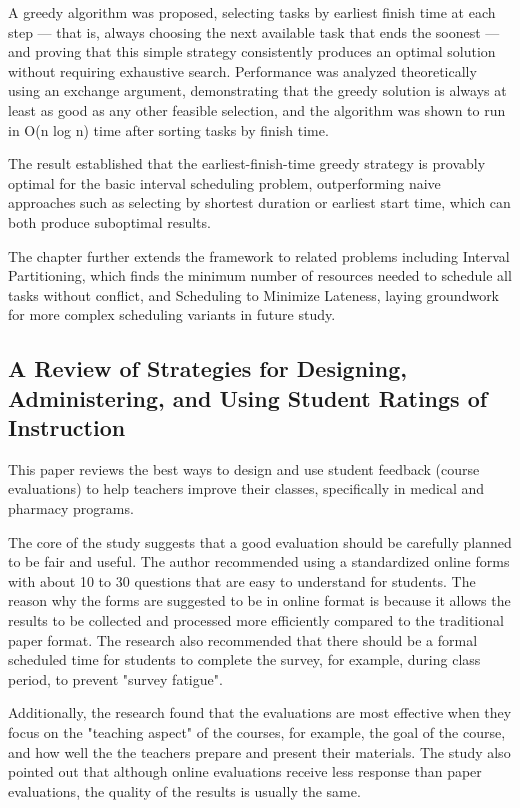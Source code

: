 A greedy algorithm was proposed, selecting tasks by earliest finish time at each step — that is, always choosing the next available task that ends the soonest — and proving that this simple strategy consistently produces an optimal solution without requiring exhaustive search.
Performance was analyzed theoretically using an exchange argument, demonstrating that the greedy solution is always at least as good as any other feasible selection, and the algorithm was shown to run in O(n log n) time after sorting tasks by finish time.

The result established that the earliest-finish-time greedy strategy is provably optimal for the basic interval scheduling problem, outperforming naive approaches such as selecting by shortest duration or earliest start time, which can both produce suboptimal results.

The chapter further extends the framework to related problems including Interval Partitioning, which finds the minimum number of resources needed to schedule all tasks without conflict, and Scheduling to Minimize Lateness, laying groundwork for more complex scheduling variants in future study.


\subsection{A Review of Strategies for Designing, Administering, and Using Student Ratings of Instruction \cite{paper_14}}

This paper reviews the best ways to design and use student feedback (course evaluations) to help teachers improve their classes, specifically in medical and pharmacy programs.

The core of the study suggests that a good evaluation should be carefully planned to be fair and useful. The author recommended using a standardized online forms with about 10 to 30 questions that are easy to understand for students. The reason why the forms are suggested to be in online format is because it allows the results to be collected and processed more efficiently compared to the traditional paper format. The research also recommended that there should be a formal scheduled time for students to complete the survey, for example, during class period, to prevent "survey fatigue".

Additionally, the research found that the evaluations are most effective when they focus on the "teaching aspect" of the courses, for example, the goal of the course, and how well the the teachers prepare and present their materials. The study also pointed out that although online evaluations receive less response than paper evaluations, the quality of the results is usually the same.

